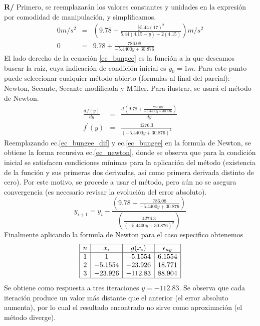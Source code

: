 \documentclass[12pt]{article}
\newcommand{\diff}[3]{\frac{d^{#3} #1}{d#2^{#3}}}
\begin{document}
\begin{enumerate}[leftmargin=*,widest=9]
\textbf{R/} Primero, se reemplazarán los valores constantes y unidades en la expresión por comodidad de manipulación, y simplificamos.
\begin{eqnarray}
0 m/s^2 & = & \left( 9.78 + \frac{\frac{1}{2}5.44 (17)^2}{5.44 (4.15-y) + 2(4.15)} \right) m/s^2 \nonumber \\
0 & = & 9.78 + \frac{786.08}{- 5.4400 y + 30.876} \label{ec_bungee}
\end{eqnarray}
El lado derecho de la ecuación \ref{ec_bungee} es la función a la que deseamos buscar la raíz, cuya indicación de condición inicial es \(y_0=1m\).
Para este punto puede seleccionar cualquier método abierto (formulas al final del parcial): Newton, Secante, Secante modificada y M\"uller.
Para ilustrar, se usará el método de Newton.
\begin{eqnarray}
\diff{f(y)}{y}{} & = & \diff{ \left(9.78 + \frac{786.08}{- 5.4400 y + 30.876} \right) }{y}{} \nonumber \\
f^{\prime}(y) & = & \frac{4276.3}{\left(- 5.4400 y + 30.876\right)^{2}} \label{ec_bungee_dif}
\end{eqnarray}
Reemplazando ec.\ref{ec_bungee_dif} y ec.\ref{ec_bungee} en la formula de Newton, se obtiene la forma recursiva ec.\ref{ec_newton}, donde se observa que para la condición inicial se satisfacen condiciones mínimas para la aplicación del método (existencia de la función y sus primeras dos derivadas, así como primera derivada distinto de cero). Por este motivo, se procede a usar el método, pero aún no se asegura convergencia (es necesario revisar la evolución del error absoluto).
\begin{equation}
y_{i+1} = y_i - \frac{\left(9.78 + \frac{786.08}{- 5.4400 y + 30.876} \right)}{\left( \frac{4276.3}{\left(- 5.4400 y + 30.876\right)^{2}} \right)} \label{ec_newton}
\end{equation}
Finalmente aplicando la formula de Newton para el caso especifico obtenemos
\begin{equation*}
\begin{array}{|c|c|c|c|}
\hline
n & x_i & g(x_i) & \epsilon_{ay} \\
\hline
1 & 1 & -5.1554 & 6.1554 \\
2 & -5.1554 & -23.926 & 18.771\\
3 & -23.926 & -112.83 & 88.904\\
\hline
\end{array}
\end{equation*}
Se obtiene como respuesta a tres iteraciones \(y = -112.83\). Se observa que cada iteración produce un valor más distante que el anterior (el error absoluto aumenta), por lo cual el resultado encontrado no sirve como aproximación (el método diverge).

\end{enumerate}
\end{document}
